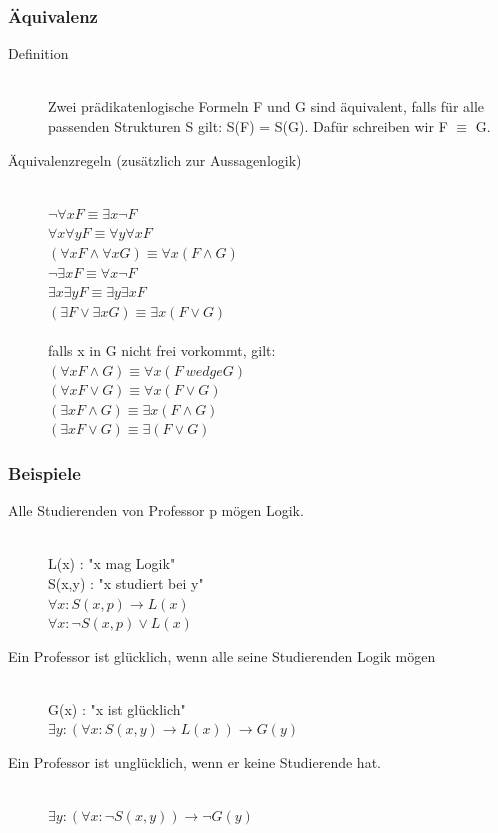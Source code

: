 \documentclass[a4paper,10pt]{article}
\newcommand{\ra}{\rightarrow}
\begin{document}
\subsubsection{\"Aquivalenz}
\begin{description}
	\item[Definition] \hfill \\
		Zwei pr\"adikatenlogische Formeln F und G sind \"aquivalent, falls f\"ur alle passenden Strukturen S gilt: S(F) = S(G). Daf\"ur schreiben wir F $\equiv$ G.
	\item[\"Aquivalenzregeln (zus\"atzlich zur Aussagenlogik)] \hfill \\
		$\neg \forall x F \equiv \exists x \neg F$ \\
		$\forall x \forall y F \equiv \forall y \forall x F$ \\
		$(\forall x F \wedge \forall x G) \equiv \forall x (F \wedge G)$ \\
		$\neg \exists x F \equiv \forall x \neg F$ \\		
		$\exists x \exists y F \equiv \exists y \exists x F$ \\
		$(\exists F \vee \exists x G) \equiv \exists x (F \vee G)$ \\ \\
		falls x in G nicht frei vorkommt, gilt: \\
		$(\forall x F \wedge G) \equiv \forall x (F \ wedge G)$ \\
		$(\forall x F \vee G) \equiv \forall x (F \vee G)$ \\
		$(\exists x F \wedge G) \equiv \exists x (F \wedge G)$ \\
		$(\exists x F \vee G) \equiv \exists (F \vee G)$ \\
\end{description}

\subsubsection{Beispiele}
\begin{description}
	\item[Alle Studierenden von Professor p m\"ogen Logik.] \hfill \\
		L(x) : "x mag Logik" \\
		S(x,y) : "x studiert bei y" \\
		$\forall x: S(x,p) \ra L(x)$ \\
		$\forall x: \neg S(x,p) \vee L(x)$
	\item[Ein Professor ist gl\"ucklich, wenn alle seine Studierenden Logik m\"ogen] \hfill \\
		G(x) : "x ist gl\"ucklich" \\
		$\exists y: (\forall x : S(x,y) \ra L(x)) \ra G(y)$
	\item[Ein Professor ist ungl\"ucklich, wenn er keine Studierende hat.] \hfill \\
		$\exists y: (\forall x : \neg S(x,y)) \ra \neg G(y)$
\end{description}
\end{document}
